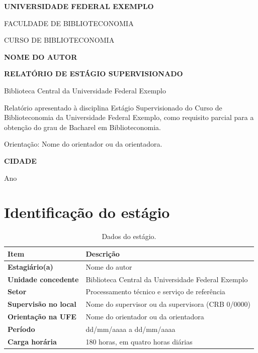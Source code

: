 \documentclass[12pt,a4paper]{report}
\newif\ifinstrucoes
\newcommand{\instrucao}[1]{\ifinstrucoes{\color{gray}\small\itshape #1\par}\fi}
\newcommand{\universidade}{Universidade Federal Exemplo}
\newcommand{\unidade}{Faculdade de Biblioteconomia}
\newcommand{\curso}{Curso de Biblioteconomia}
\newcommand{\estagiario}{Nome do autor}
\newcommand{\titulo}{Relatório de estágio supervisionado}
\newcommand{\concedente}{Biblioteca Central da Universidade Federal Exemplo}
\newcommand{\supervisor}{Nome do supervisor ou da supervisora (CRB 0/0000)}
\newcommand{\orientador}{Nome do orientador ou da orientadora}
\newcommand{\periodo}{dd/mm/aaaa a dd/mm/aaaa}
\newcommand{\cargahoraria}{180 horas}
\newcommand{\local}{Cidade}
\newcommand{\data}{Ano}
\begin{document}
\begin{titlepage}
  \centering
  {\bfseries\MakeUppercase{\universidade}\par}
  {\MakeUppercase{\unidade}\par}
  {\MakeUppercase{\curso}\par}
  \vspace{3cm}
  {\bfseries\MakeUppercase{\estagiario}\par}
  \vfill
  {\large\bfseries\MakeUppercase{\titulo}\par}
  \vspace{0.6em}
  {\concedente\par}
  \vfill
  \hfill
  \begin{minipage}{0.55\textwidth}
    \singlespacing\small
    Relatório apresentado à disciplina Estágio Supervisionado do \curso{} da \universidade{}, como requisito parcial para a obtenção do grau de Bacharel em Biblioteconomia.\par
    \medskip
    Orientação: \orientador.
  \end{minipage}
  \vfill
  {\bfseries\MakeUppercase{\local}\par\data\par}
\end{titlepage}

\tableofcontents
\clearpage

\section{Identificação do estágio}
\instrucao{Preencha o quadro com os dados do termo de compromisso. Ele resume quem, onde, quando e com quantas horas o estágio foi feito.}

\begin{table}[htbp]
  \centering
  \caption{Dados do estágio.}
  \label{tab:identificacao}
  \renewcommand{\arraystretch}{1.3}
  \begin{tabularx}{\textwidth}{>{\bfseries}p{4.2cm} X}
    \toprule
    \rowcolor{fundo} Item & Descrição \\
    \midrule
    Estagiário(a)         & \estagiario \\
    Unidade concedente    & \concedente \\
    Setor                 & Processamento técnico e serviço de referência \\
    Supervisão no local   & \supervisor \\
    Orientação na UFE     & \orientador \\
    Período               & \periodo \\
    Carga horária         & \cargahoraria{}, em quatro horas diárias \\
    \bottomrule
  \end{tabularx}
\end{table}
\end{document}
